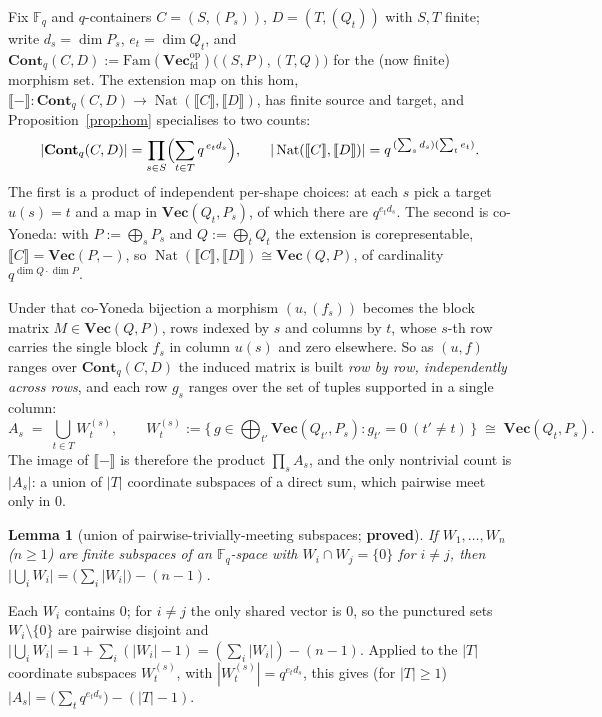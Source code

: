 \documentclass[11pt]{article}
\theoremstyle{plain}
\newtheorem{lemma}{Lemma}
\theoremstyle{definition}
\theoremstyle{remark}
\newcommand{\Vect}{\mathbf{Vec}}
\newcommand{\Vecfd}{\mathbf{Vec}_{\mathrm{fd}}}
\newcommand{\Fam}{\mathrm{Fam}}
\newcommand{\Cont}{\mathbf{Cont}}
\newcommand{\ext}[1]{\llbracket #1 \rrbracket}
\newcommand{\op}{\mathrm{op}}
\DeclareMathOperator{\Nat}{Nat}
\DeclareMathOperator{\dm}{dim}
\begin{document}
Fix $\mathbb F_q$ and $q$-containers $C=(S,(P_s))$, $D=(T,(Q_t))$ with $S,T$ finite; write
$d_s=\dm P_s$, $e_t=\dm Q_t$, and $\Cont_q(C,D):=\Fam(\Vecfd^\op)\bigl((S,P),(T,Q)\bigr)$ for the
(now finite) morphism set. The extension map on this hom,
$\ext{-}\colon\Cont_q(C,D)\to\Nat(\ext C,\ext D)$, has finite source and target, and
Proposition~\ref{prop:hom} specialises to two counts:
\begin{equation}
\label{eq:counts}
   |\Cont_q(C,D)|=\prod_{s\in S}\Bigl(\sum_{t\in T}q^{\,e_t d_s}\Bigr),
   \qquad
   |\Nat(\ext C,\ext D)|=q^{\,(\sum_s d_s)(\sum_t e_t)}.
\end{equation}
The first is a product of independent per-shape choices: at each $s$ pick a target $u(s)=t$ and a
map in $\Vect(Q_t,P_s)$, of which there are $q^{e_t d_s}$. The second is co-Yoneda: with
$P:=\bigoplus_s P_s$ and $Q:=\bigoplus_t Q_t$ the extension is corepresentable,
$\ext C=\Vect(P,-)$, so $\Nat(\ext C,\ext D)\cong\Vect(Q,P)$, of cardinality
$q^{\dm Q\cdot\dm P}$.

Under that co-Yoneda bijection a morphism $(u,(f_s))$ becomes the block matrix $M\in\Vect(Q,P)$,
rows indexed by $s$ and columns by $t$, whose $s$-th row carries the single block $f_s$ in column
$u(s)$ and zero elsewhere. So as $(u,f)$ ranges over $\Cont_q(C,D)$ the induced matrix is built
\emph{row by row, independently across rows}, and each row $g_s$ ranges over the set of tuples
supported in a single column:
\[
   A_s\;=\;\bigcup_{t\in T}W_t^{(s)},\qquad
   W_t^{(s)}:=\{\,g\in\textstyle\bigoplus_{t'}\Vect(Q_{t'},P_s):g_{t'}=0\ (t'\neq t)\,\}
   \;\cong\;\Vect(Q_t,P_s).
\]
The image of $\ext{-}$ is therefore the product $\prod_s A_s$, and the only nontrivial count is
$|A_s|$: a union of $|T|$ coordinate subspaces of a direct sum, which pairwise meet only in $0$.

\begin{lemma}[union of pairwise-trivially-meeting subspaces; \textbf{proved}]
\label{lem:union}
If $W_1,\dots,W_n$ ($n\geq1$) are finite subspaces of an $\mathbb F_q$-space with
$W_i\cap W_j=\{0\}$ for $i\neq j$, then
$\bigl|\bigcup_i W_i\bigr|=\bigl(\sum_i|W_i|\bigr)-(n-1)$.
\end{lemma}

\noindent Each $W_i$ contains $0$; for $i\neq j$ the only shared vector is $0$, so the punctured
sets $W_i\setminus\{0\}$ are pairwise disjoint and
$\bigl|\bigcup_i W_i\bigr|=1+\sum_i(|W_i|-1)=(\sum_i|W_i|)-(n-1)$. Applied to the $|T|$ coordinate
subspaces $W_t^{(s)}$, with $|W_t^{(s)}|=q^{e_t d_s}$, this gives (for $|T|\geq1$)
$|A_s|=\bigl(\sum_t q^{e_t d_s}\bigr)-(|T|-1)$.
\end{document}
